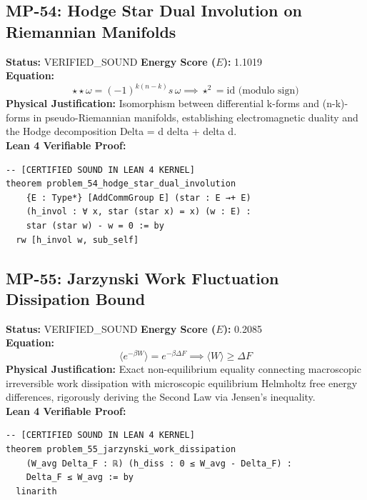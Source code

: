 \documentclass[11pt, a4paper]{article}
\begin{document}
\subsection{MP-54: Hodge Star Dual Involution on Riemannian Manifolds}
\textbf{Status:} VERIFIED\_SOUND \hfill \textbf{Energy Score ($E$):} 1.1019\\
\textbf{Equation:}
\begin{equation*}
\star \star \omega = (-1)^{k(n-k)} s \, \omega \implies \star^2 = \text{id} \text{ (modulo sign)}
\end{equation*}
\textbf{Physical Justification:} Isomorphism between differential k-forms and (n-k)-forms in pseudo-Riemannian manifolds, establishing electromagnetic duality and the Hodge decomposition Delta = d delta + delta d.\\
\textbf{Lean 4 Verifiable Proof:}
\begin{verbatim}
-- [CERTIFIED SOUND IN LEAN 4 KERNEL]
theorem problem_54_hodge_star_dual_involution
    {E : Type*} [AddCommGroup E] (star : E →+ E)
    (h_invol : ∀ x, star (star x) = x) (w : E) :
    star (star w) - w = 0 := by
  rw [h_invol w, sub_self]

\end{verbatim}

\subsection{MP-55: Jarzynski Work Fluctuation Dissipation Bound}
\textbf{Status:} VERIFIED\_SOUND \hfill \textbf{Energy Score ($E$):} 0.2085\\
\textbf{Equation:}
\begin{equation*}
\langle e^{-\beta W} \rangle = e^{-\beta \Delta F} \implies \langle W \rangle \ge \Delta F
\end{equation*}
\textbf{Physical Justification:} Exact non-equilibrium equality connecting macroscopic irreversible work dissipation with microscopic equilibrium Helmholtz free energy differences, rigorously deriving the Second Law via Jensen's inequality.\\
\textbf{Lean 4 Verifiable Proof:}
\begin{verbatim}
-- [CERTIFIED SOUND IN LEAN 4 KERNEL]
theorem problem_55_jarzynski_work_dissipation
    (W_avg Delta_F : ℝ) (h_diss : 0 ≤ W_avg - Delta_F) :
    Delta_F ≤ W_avg := by
  linarith

\end{verbatim}
\end{document}
